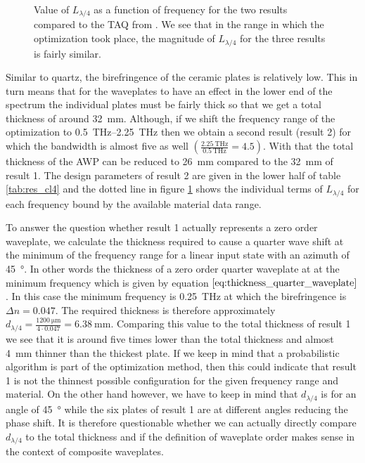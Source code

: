 \begin{figure}[H]
    \centering
    
    \caption{Value of $L_{\lambda/4}$ as a function of frequency for the two results compared to the TAQ from \cite{Masson2006}. We see that in the range in which the optimization took place, the magnitude of $L_{\lambda/4}$ for the three results is fairly similar.}
    \label{fig:loss_function_cl4}
\end{figure}

Similar to quartz, the birefringence of the ceramic plates is relatively low. This in turn means that for the waveplates to have an effect in the lower end of the spectrum the individual plates must be fairly thick so that we get a total thickness of around \SI{32}{\milli \meter}. Although, if we shift the frequency range of the optimization to \SIrange[range-phrase=-, range-units=single]{0.5}{2.25}{\tera \hertz} then we obtain a second result (result 2) for which the bandwidth is almost five as well $\left(\frac{\SI{2.25}{\tera \hertz}}{\SI{0.5}{\tera \hertz}}=4.5\right)$. With that the total thickness of the AWP can be reduced to \SI{26}{\milli \meter} compared to the \SI{32}{\milli \meter} of result 1. The design parameters of result 2 are given in the lower half of table \ref{tab:res_cl4} and the dotted line in figure \ref{fig:loss_function_cl4} shows the individual terms of $L_{\lambda/4}$ for each frequency bound by the available material data range. 

To answer the question whether result 1 actually represents a zero order waveplate, we calculate the thickness required to cause a quarter wave shift at the minimum of the frequency range for a linear input state with an azimuth of \SI{45}{\degree}. In other words the thickness of a zero order quarter waveplate at at the minimum frequency which is given by equation $\ref{eq:thickness_quarter_waveplate}$. In this case the minimum frequency is \SI{0.25}{\tera \hertz} at which the birefringence is $\Delta n = 0.047$. The required thickness is therefore approximately $d_{\lambda/4}=\frac{\SI{1200}{\micro \meter}}{4\cdot0.047}=\SI{6.38}{\milli \meter}$. Comparing this value to the total thickness of result 1 we see that it is around five times lower than the total thickness and almost \SI{4}{\milli \meter} thinner than the thickest plate. If we keep in mind that a probabilistic algorithm is part of the optimization method, then this could indicate that result 1 is not the thinnest possible configuration for the given frequency range and material. On the other hand however, we have to keep in mind that $d_{\lambda/4}$ is for an angle of \SI{45}{\degree} while the six plates of result 1 are at different angles reducing the phase shift. It is therefore questionable whether we can actually directly compare $d_{\lambda/4}$ to the total thickness and if the definition of waveplate order makes sense in the context of composite waveplates. 

